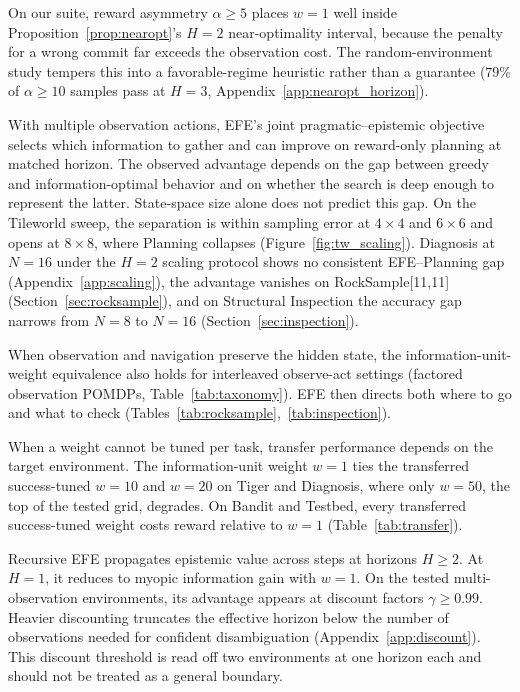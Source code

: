 On our suite, reward asymmetry $\alpha \geq 5$ places $w{=}1$ well inside Proposition~\ref{prop:nearopt}'s $H{=}2$ near-optimality interval, because the penalty for a wrong commit far exceeds the observation cost. The random-environment study tempers this into a favorable-regime heuristic rather than a guarantee ($79\%$ of $\alpha \ge 10$ samples pass at $H{=}3$, Appendix~\ref{app:nearopt_horizon}).

With multiple observation actions, EFE's joint pragmatic--epistemic objective selects which information to gather and can improve on reward-only planning at matched horizon. The observed advantage depends on the gap between greedy and information-optimal behavior and on whether the search is deep enough to represent the latter. State-space size alone does not predict this gap. On the Tileworld sweep, the separation is within sampling error at $4{\times}4$ and $6{\times}6$ and opens at $8{\times}8$, where Planning collapses (Figure~\ref{fig:tw_scaling}). Diagnosis at $N{=}16$ under the $H{=}2$ scaling protocol shows no consistent EFE--Planning gap (Appendix~\ref{app:scaling}), the advantage vanishes on RockSample[11,11] (Section~\ref{sec:rocksample}), and on Structural Inspection the accuracy gap narrows from $N{=}8$ to $N{=}16$ (Section~\ref{sec:inspection}).

When observation and navigation preserve the hidden state, the information-unit-weight equivalence also holds for interleaved observe-act settings (factored observation POMDPs, Table~\ref{tab:taxonomy}). EFE then directs both where to go and what to check (Tables~\ref{tab:rocksample},~\ref{tab:inspection}).

When a weight cannot be tuned per task, transfer performance depends on the target environment. The information-unit weight $w{=}1$ ties the transferred success-tuned $w{=}10$ and $w{=}20$ on Tiger and Diagnosis, where only $w{=}50$, the top of the tested grid, degrades. On Bandit and Testbed, every transferred success-tuned weight costs reward relative to $w{=}1$ (Table~\ref{tab:transfer}).

Recursive EFE propagates epistemic value across steps at horizons $H \geq 2$. At $H{=}1$, it reduces to myopic information gain with $w{=}1$. On the tested multi-observation environments, its advantage appears at discount factors $\gamma \geq 0.99$. Heavier discounting truncates the effective horizon below the number of observations needed for confident disambiguation (Appendix~\ref{app:discount}). This discount threshold is read off two environments at one horizon each and should not be treated as a general boundary.

